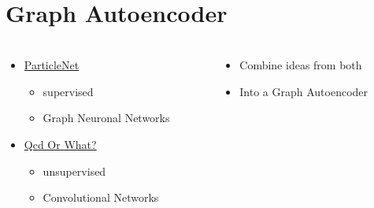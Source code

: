 \documentclass[hyperref={pdfpagelabels=false}]{beamer}
\begin{document}
\begin{frame}[label=Top Tagging]
\begin{columns}[c]
\begin{column}{0.48\textwidth}
\end{column}%
\hfill%
\end{columns}

\end{frame}



\newpage
\section{Graph Autoencoder}\label{sec:Graph Autoencoder}

\begin{frame}[label=]
\frametitle{}
\begin{columns}[c] %
\begin{column}{0.48\textwidth}%
\begin{itemize}

    \item \href{https://arxiv.org/abs/1902.08570}{
ParticleNet
}

\begin{itemize}

    \item supervised

    \item Graph Neuronal Networks


\end{itemize}
    \item \href{https://arxiv.org/abs/1808.08979}{
Qcd Or What?
}

\begin{itemize}

    \item unsupervised

    \item Convolutional Networks


\end{itemize}

\end{itemize}
\end{column}%
\hfill%
\begin{column}{0.48\textwidth}%
\begin{itemize}

    \item Combine ideas from both

    \item Into a Graph Autoencoder


\end{itemize}
\end{column}%
\hfill%
\end{columns}

\end{frame}
\end{document}
